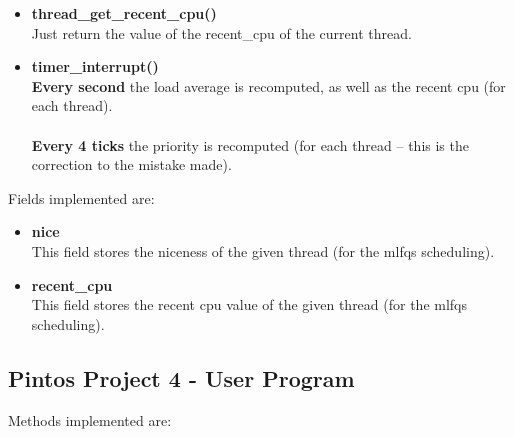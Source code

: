 \documentclass{article}
\begin{document}
\begin{itemize}
	\item \textbf{thread\_get\_recent\_cpu()}
	\vspace{.2cm} \\
	Just return the value of the recent\_cpu of the current thread.
	
	\item \textbf{timer\_interrupt()}
	\vspace{.2cm} \\
	\textbf{Every second} the load average is recomputed, as well as the recent cpu (for each thread). \\ \\
	\textbf{Every 4 ticks} the priority is recomputed (for each thread -- this is the correction to the mistake made).
\end{itemize}
Fields implemented are:

\begin{itemize}
	\item \textbf{nice}
	\vspace{.2cm} \\
	This field stores the niceness of the given thread (for the mlfqs scheduling).
	
	\item \textbf{recent\_cpu}
	\vspace{.2cm} \\
	This field stores the recent cpu value of the given thread (for the mlfqs scheduling).
\end{itemize}

\newpage

\subsection{Pintos Project 4 - User Program}

Methods implemented are:
\end{document}
